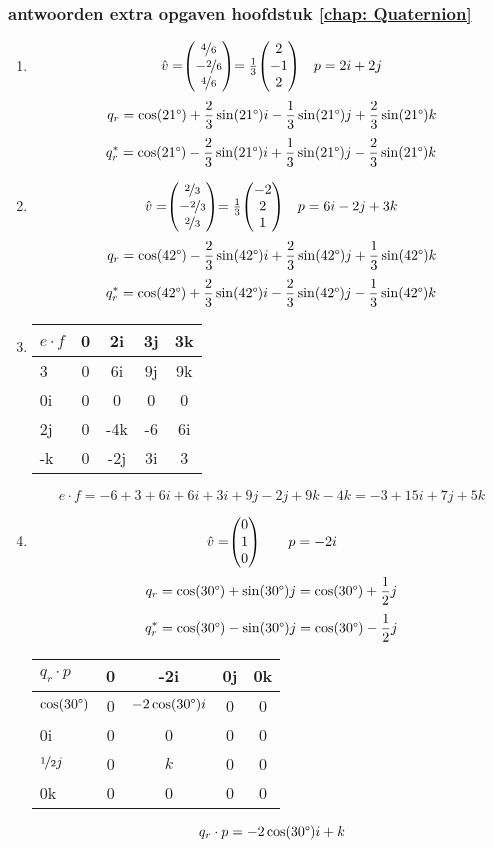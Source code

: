\subsubsection{antwoorden extra opgaven hoofdstuk \ref{chap: Quaternion}}
\begin{enumerate}
	\item 
	\[\hat{v} = \vecdrie{\nicefrac{4}{6}}{-\nicefrac{2}{6}}{\nicefrac{4}{6}} = \frac{1}{3}\vecdrie{2}{-1}{2}
	\quad p  = 2i + 2j\]
	\[q_r   =  \cos(21 \degree)  + \frac{2}{3}\sin(21 \degree) i - \frac{1}{3}\sin(21 \degree) j + \frac{2}{3} \sin(21 \degree) k\]
	\[q^*_r =  \cos(21 \degree)  - \frac{2}{3}\sin(21 \degree) i + \frac{1}{3}\sin(21 \degree) j - \frac{2}{3} \sin(21 \degree) k\]
	
	\item 
	\[\hat{v} = \vecdrie{\nicefrac{2}{3}}{- \nicefrac{2}{3}}{\nicefrac{2}{3}} = \frac{1}{3}\vecdrie{-2}{2}{1}
	\quad p  = 6i - 2j + 3k\]
    \[ q_r  =  \cos(42 \degree)  - \frac{2}{3}\sin(42 \degree) i + \frac{2}{3}\sin(42 \degree) j + \frac{1}{3}\sin(42 \degree) k \]
	\[q^*_r      =  \cos(42 \degree)  + \frac{2}{3}\sin(42 \degree) i	- \frac{2}{3}\sin(42 \degree) j - \frac{1}{3}\sin(42 \degree) k\]
		
	\item
	\begin{NiceTabular}{ | a | c | c | c | c |}
		\hline
         \RowStyle{\color{white}} %
	 $ e\cdot f $ & 0 & 2i  & 3j & 3k \\           & 0 & 6i  & 9j & 9k \\ \hline
		0i         & 0 & 0   & 0  & 0  \\ \hline
		2j         & 0 & -4k & -6 & 6i \\ \hline
		-k         & 0 & -2j & 3i & 3  \\ 
		\hline 
	\end{NiceTabular}
	\[e\cdot f = -6+3+6i+6i+3i+9j-2j+9k-4k = -3 +15i + 7j + 5k \]
	
	\item 
	\[\hat{v} = \vecdrie{0}{1}{0} \qquad p  = -2i \]
	\[q_r    =  \cos(30 \degree)  + \sin(30 \degree) j  =  \cos(30 \degree) + \frac{1}{2}j\]
	\[q^*_r  =  \cos(30 \degree)  - \sin(30 \degree) j  =  \cos(30 \degree) - \frac{1}{2}j \]
	\begin{NiceTabular}{ | a | c | c | c | c |}
		\hline
         \RowStyle{\color{white}} %
		$ q_r\cdot p $        & 0 & -2i  &   0j   & 0k \\ \hline
		$\cos(30 \degree) $   & 0 & $ -2\cos(30 \degree) i  $ &   0    & 0  \\ \hline
		0i                    & 0 & 0    &   0    & 0  \\ \hline
		$\nicefrac{1}{2}j$    & 0 & $k$  &   0    & 0  \\ \hline
		0k                    & 0 & 0    &   0    & 0  \\ 
		\hline 
	\end{NiceTabular}
	\[q_r\cdot p = -2\cos(30 \degree) i + k\]
	

\end{enumerate}
